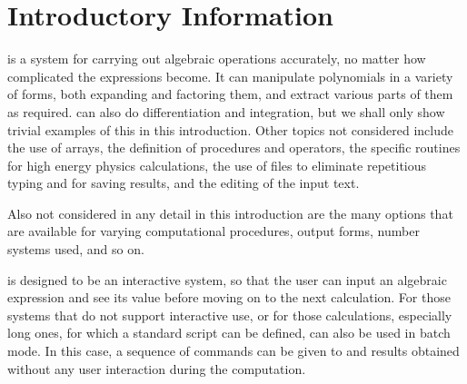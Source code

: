 \chapter{Introductory Information}

 is a system for carrying out algebraic
operations accurately, no matter how complicated the expressions become.
It can manipulate polynomials in a variety of forms, both expanding and
factoring them, and extract various parts of them as required.  {\REDUCE} can
also do differentiation and integration, but we shall only show trivial
examples of this in this introduction.  Other topics not
considered include the use of arrays, the definition of procedures and
operators, the specific routines for high energy physics calculations, the
use of files to eliminate repetitious typing and for saving results, and
the editing of the input text.

Also not considered in any detail in this introduction are the many options
that are available for varying computational procedures, output forms,
number systems used, and so on.

{\REDUCE} is designed to be an interactive system, so that the user can input
an algebraic expression and see its value before moving on to the next
calculation.  For those systems that do not support interactive use, or
for those calculations, especially long ones, for which a standard script
can be defined, {\REDUCE} can also be used in batch mode. In this case,
a sequence of commands can be given to {\REDUCE} and results obtained
without any user interaction during the computation.

